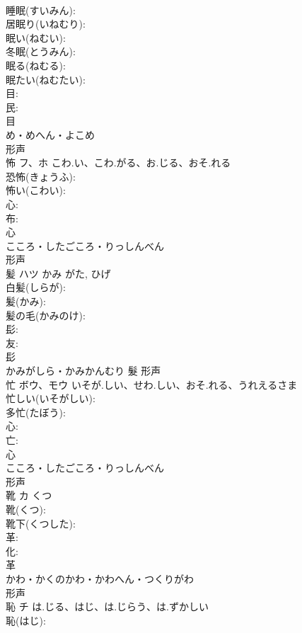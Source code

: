 \documentclass[8pt]{extreport}
\begin{document}
\begin{CJK}{UTF8}{min}
\\	睡眠(すいみん): 
\\	居眠り(いねむり): 
\\	眠い(ねむい): 
\\	冬眠(とうみん): 
\\	眠る(ねむる): 
\\	眠たい(ねむたい): 
\\	目: 
\\	民: 
\\	目	
\\	め・めへん・よこめ	
\\	形声 
\\	怖	フ、ホ	こわ.い、こわ.がる、お.じる、おそ.れる		
\\	恐怖(きょうふ): 
\\	怖い(こわい): 
\\	心: 
\\	布: 
\\	心	
\\	こころ・したごころ・りっしんべん	
\\	形声 
\\	髪	ハツ	かみ	がた, ひげ	
\\	白髪(しらが): 
\\	髪(かみ): 
\\	髪の毛(かみのけ): 
\\	髟: 
\\	友: 
\\	髟	
\\	かみがしら・かみかんむり	髮	形声 
\\	忙	ボウ、モウ	いそが.しい、せわ.しい、おそ.れる、うれえるさま		
\\	忙しい(いそがしい): 
\\	多忙(たぼう): 
\\	心: 
\\	亡: 
\\	心	
\\	こころ・したごころ・りっしんべん	
\\	形声 
\\	靴	カ	くつ		
\\	靴(くつ): 
\\	靴下(くつした): 
\\	革: 
\\	化: 
\\	革	
\\	かわ・かくのかわ・かわへん・つくりがわ	
\\	形声 
\\	恥	チ	は.じる、はじ、は.じらう、は.ずかしい		
\\	恥(はじ): 

\end{CJK}
\end{document}
